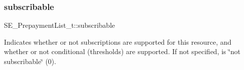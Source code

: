 \subsubsection{\texorpdfstring{subscribable}{subscribable}}
{\footnotesize\ttfamily S\+E\+\_\+\+Prepayment\+List\+\_\+t\+::subscribable}

Indicates whether or not subscriptions are supported for this resource, and whether or not conditional (thresholds) are supported. If not specified, is \char`\"{}not subscribable\char`\"{} (0). 